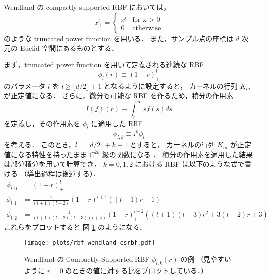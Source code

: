 Wendland の compactly supported RBF においては，
\begin{equation}
    x_+^l = \begin{cases}
        x^l & \text{for x > 0} \\
        0   & \text{otherwise}
    \end{cases}
\end{equation}
のような truncated power function を用いる．
また，サンプル点の座標は $d$ 次元の Euclid 空間にあるものとする．

まず，truncated power function を用いて定義される連続な RBF
\begin{equation}
    \phi_l(r) \equiv (1 - r)_+^l
\end{equation}
のパラメータ $l$ を $l \ge \lfloor d/2 \rfloor + 1$ となるように設定すると，
カーネルの行列 $K_m$ が正定値になる．
さらに，微分も可能な RBF を作るため，積分の作用素
\begin{equation}
    I(f)(r) \equiv \int_r^\infty sf(s) ds
\end{equation}
を定義し，その作用素を $\phi_l$ に適用した RBF
\begin{equation}
    \phi_{l,k} \equiv I^k \phi_l \label{eq:rbf_wendland-csrbf_definition}
\end{equation}
を考える．
このとき，$l = \lfloor d/2 \rfloor + k + 1$ とすると，
カーネルの行列 $K_m$ が正定値になる特性を持ったまま
$C^{2k}$ 級の関数になる \cite[Theorem 3.5]{Wendland1995}．
積分の作用素を適用した結果は部分積分を用いて計算でき，
$k = 0, 1, 2$ における RBF は以下のような式で書ける
（導出過程は後述する）．
\begin{align}
    \phi_{l,0} & = (1 - r)_+^l
    \label{eq:rbf_wendland-csrbf_formula0}                                        \\
    \phi_{l,1} & = \frac{1}{(l+1)(l+2)} (1 - r)_+^{l+1} \left( (l+1)r + 1 \right)
    \label{eq:rbf_wendland-csrbf_formula1}                                        \\
    \phi_{l,2} & = \frac{1}{(l+1)(l+2)(l+3)(l+4)} (1 - r)_+^{l+2}
    \left( (l+1)(l+3)r^2 + 3(l+2)r + 3 \right)
    \label{eq:rbf_wendland-csrbf_formula2}
\end{align}
これらをプロットすると
図 \ref{fig:rbf_wendland-csrbf}
のようになる．

\begin{figure}[tp]
    \centering
    \texttt{[image: plots/rbf-wendland-csrbf.pdf]}
    \caption{Wendland の Compactly Supported RBF $\phi_{l,k}(r)$ \cite{Wendland1995} の例%
        （見やすいように $r = 0$ のときの値に対する比をプロットしている．）}
    \label{fig:rbf_wendland-csrbf}
\end{figure}

